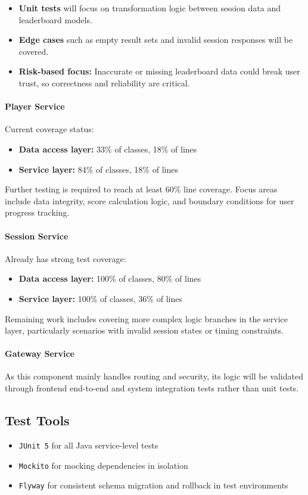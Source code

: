 \begin{itemize}
    \item \textbf{Unit tests} will focus on transformation logic between session data and leaderboard models.
    \item \textbf{Edge cases} such as empty result sets and invalid session responses will be covered.
    \item \textbf{Risk-based focus:} Inaccurate or missing leaderboard data could break user trust, so correctness and reliability are critical.
\end{itemize}

\paragraph{Player Service}
Current coverage status:

\begin{itemize}
    \item \textbf{Data access layer:} 33\% of classes, 18\% of lines
    \item \textbf{Service layer:} 84\% of classes, 18\% of lines
\end{itemize}

Further testing is required to reach at least 60\% line coverage. Focus areas include data integrity, score calculation logic, and boundary conditions for user progress tracking.

\paragraph{Session Service}
Already has strong test coverage:

\begin{itemize}
    \item \textbf{Data access layer:} 100\% of classes, 80\% of lines
    \item \textbf{Service layer:} 100\% of classes, 36\% of lines
\end{itemize}

Remaining work includes covering more complex logic branches in the service layer, particularly scenarios with invalid session states or timing constraints.

\paragraph{Gateway Service}
As this component mainly handles routing and security, its logic will be validated through frontend end-to-end and system integration tests rather than unit tests.

\subsection*{Test Tools}
\begin{itemize}
    \item \texttt{JUnit 5} for all Java service-level tests
    \item \texttt{Mockito} for mocking dependencies in isolation
    \item \texttt{Flyway} for consistent schema migration and rollback in test environments
\end{itemize}
